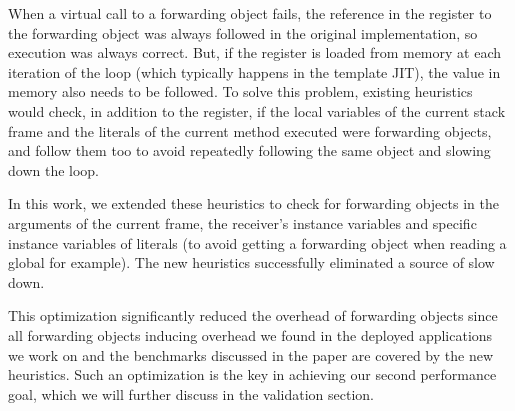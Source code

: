 \documentclass[sigplan,10pt,screen]{acmart}\settopmatter{printfolios=true,printccs=true,printacmref=true}
\begin{document}
When a virtual call to a forwarding object fails, the reference in the register to the forwarding object was always followed in the original implementation, so execution was always correct. But, if the register is loaded from memory at each iteration of the loop (which typically happens in the template JIT), the value in memory also needs to be followed. %
To solve this problem, existing heuristics would check, in addition to the register, if the local variables of the current stack frame and the literals of the current method executed were forwarding objects, and follow them too to avoid repeatedly following the same object and slowing down the loop.
 
In this work, we extended these heuristics to check for forwarding objects in the arguments of the current frame, the receiver's instance variables and specific instance variables of literals (to avoid getting a forwarding object when reading a global for example). The new heuristics successfully eliminated a source of slow down.

This optimization significantly reduced the overhead of forwarding objects since all forwarding objects inducing overhead we found in the deployed applications we work on and the benchmarks discussed in the paper are covered by the new heuristics.
Such an optimization is the key in achieving our second performance goal, which we will further discuss in the validation section.
\end{document}
